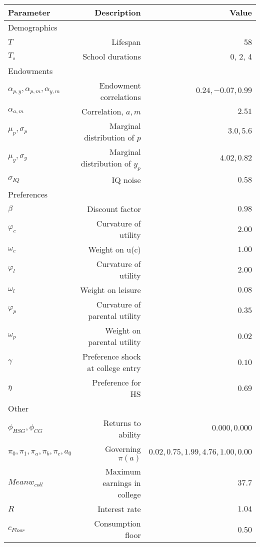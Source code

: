 \begin{tabular}{lrr}
\hline
Parameter & Description  & Value  \\
\hline
Demographics &   &   \\
$T$ & Lifespan  & 58  \\
$T_{s}$ & School durations  & 0, 2, 4  \\
Endowments &   &   \\
$\alpha_{p,y}, \alpha_{p,m}, \alpha_{y,m}$ & Endowment correlations  & $0.24, -0.07, 0.99$  \\
$\alpha_{a,m}$ & Correlation, $a,m$  & $2.51$  \\
$\mu_{p}, \sigma_{p}$ & Marginal distribution of $p$  & $3.0, 5.6$  \\
$\mu_{y}, \sigma_{y}$ & Marginal distribution of $y_{p}$  & $4.02, 0.82$  \\
$\sigma_{IQ}$ & IQ noise  & $0.58$  \\
Preferences &   &   \\
$\beta$ & Discount factor  & $0.98$  \\
$\varphi_{c}$ & Curvature of utility  & $2.00$  \\
$\omega_{c}$ & Weight on u(c)  & $1.00$  \\
$\varphi_{l}$ & Curvature of utility  & $2.00$  \\
$\omega_{l}$ & Weight on leisure  & $0.08$  \\
$\varphi_{p}$ & Curvature of parental utility  & $0.35$  \\
$\omega_{p}$ & Weight on parental utility  & $0.02$  \\
$\gamma$ & Preference shock at college entry  & $0.10$  \\
$\bar{\eta}$ & Preference for HS  & $0.69$  \\
Other &   &   \\
$\phi_{HSG}, \phi_{CG}$ & Returns to ability  & $0.000, 0.000$  \\
$\pi_{0}, \pi_{1}, \pi_{a}, \pi_{b}, \pi_{c}, a_{0}$ & Governing $\pi(a)$  & $0.02, 0.75, 1.99, 4.76, 1.00, 0.00$  \\
$Mean w_{coll}$ & Maximum earnings in college  & $37.7$  \\
$R$ & Interest rate  & $1.04$  \\
$c_{Floor}$ & Consumption floor  & 0.50  \\
\hline
\end{tabular}%
